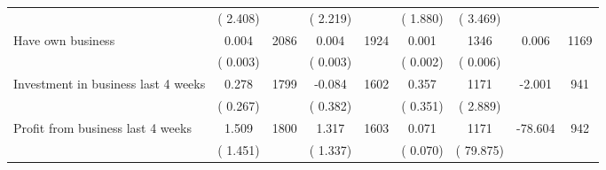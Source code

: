\begin{tabular}{l*{8}{c}}
                       &       (       2.408)            &                               &       (       2.219)            &                               &       (       1.880)            &       (       3.469) &                  \\
Have own business        &              0.004      &       2086       &              0.004      &       1924       &              0.001      &       1346  &        0.006 &       1169       \\
                       &       (       0.003)            &                               &       (       0.003)            &                               &       (       0.002)            &       (       0.006) &                  \\
Investment in business last 4 weeks        &              0.278      &       1799       &             -0.084      &       1602       &              0.357      &       1171  &       -2.001 &       941       \\
                       &       (       0.267)            &                               &       (       0.382)            &                               &       (       0.351)            &       (       2.889) &                  \\
Profit from business last 4 weeks        &              1.509      &       1800       &              1.317      &       1603       &              0.071      &       1171  &      -78.604 &       942       \\
                       &       (       1.451)            &                               &       (       1.337)            &                               &       (       0.070)            &       (      79.875) &                  \\
\hline \end{tabular}